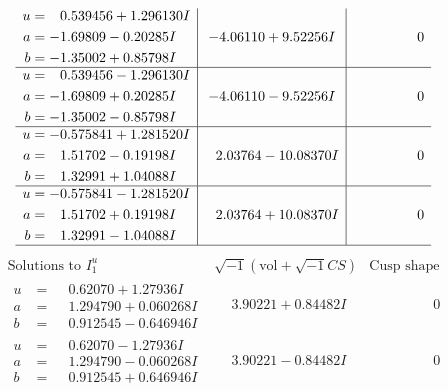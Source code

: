 \documentclass[1p]{elsarticle_modified}
\theoremstyle{definition}
\newcommand{\I}{\sqrt{-1}}
\begin{document}
$$\begin{array}{c|c|c}
\begin{aligned}
u &= \phantom{-}0.539456 + 1.296130 I \\
a &= -1.69809 - 0.20285 I \\
b &= -1.35002 + 0.85798 I\end{aligned}
 & -4.06110 + 9.52256 I & \phantom{-0.000000 } 0 \\ \hline\begin{aligned}
u &= \phantom{-}0.539456 - 1.296130 I \\
a &= -1.69809 + 0.20285 I \\
b &= -1.35002 - 0.85798 I\end{aligned}
 & -4.06110 - 9.52256 I & \phantom{-0.000000 } 0 \\ \hline\begin{aligned}
u &= -0.575841 + 1.281520 I \\
a &= \phantom{-}1.51702 - 0.19198 I \\
b &= \phantom{-}1.32991 + 1.04088 I\end{aligned}
 & \phantom{-}2.03764 - 10.08370 I & \phantom{-0.000000 } 0 \\ \hline\begin{aligned}
u &= -0.575841 - 1.281520 I \\
a &= \phantom{-}1.51702 + 0.19198 I \\
b &= \phantom{-}1.32991 - 1.04088 I\end{aligned}
 & \phantom{-}2.03764 + 10.08370 I & \phantom{-0.000000 } 0\\
 \hline 
 \end{array}$$\newpage$$\begin{array}{c|c|c}  
\text{Solutions to }I^u_{1}& \I (\text{vol} + \sqrt{-1}CS) & \text{Cusp shape}\\
 \hline 
\begin{aligned}
u &= \phantom{-}0.62070 + 1.27936 I \\
a &= \phantom{-}1.294790 + 0.060268 I \\
b &= \phantom{-}0.912545 - 0.646946 I\end{aligned}
 & \phantom{-}3.90221 + 0.84482 I & \phantom{-0.000000 } 0 \\ \hline\begin{aligned}
u &= \phantom{-}0.62070 - 1.27936 I \\
a &= \phantom{-}1.294790 - 0.060268 I \\
b &= \phantom{-}0.912545 + 0.646946 I\end{aligned}
 & \phantom{-}3.90221 - 0.84482 I & \phantom{-0.000000 } 0 \\ \hline\begin{aligned}

\end{aligned}
\end{array}$$
\end{document}
